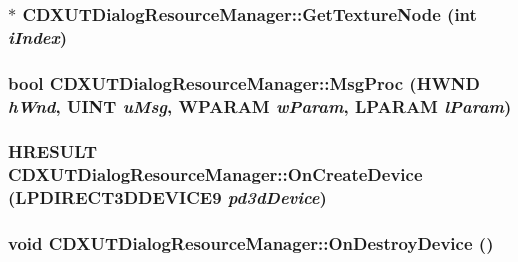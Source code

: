 \label{class_c_d_x_u_t_dialog_resource_manager_a06bc003b7adeab308924d576872d7808}
\hypertarget{class_c_d_x_u_t_dialog_resource_manager_a1c4a4da7f12745983dd5f3f945457b6f}{
\subsubsection[{GetTextureNode}]{$\ast$ CDXUTDialogResourceManager::GetTextureNode ({\bf int} {\em iIndex})}}
\label{class_c_d_x_u_t_dialog_resource_manager_a1c4a4da7f12745983dd5f3f945457b6f}
\hypertarget{class_c_d_x_u_t_dialog_resource_manager_a5eb2225e9b52752735c7557734bc009d}{
\subsubsection[{MsgProc}]{\setlength{\rightskip}{0pt plus 5cm}bool CDXUTDialogResourceManager::MsgProc (HWND {\em hWnd}, \/  UINT {\em uMsg}, \/  WPARAM {\em wParam}, \/  LPARAM {\em lParam})}}
\label{class_c_d_x_u_t_dialog_resource_manager_a5eb2225e9b52752735c7557734bc009d}
\hypertarget{class_c_d_x_u_t_dialog_resource_manager_a6b5ce20418b9af09844c9d4a7cede1f3}{
\subsubsection[{OnCreateDevice}]{\setlength{\rightskip}{0pt plus 5cm}HRESULT CDXUTDialogResourceManager::OnCreateDevice (LPDIRECT3DDEVICE9 {\em pd3dDevice})}}
\label{class_c_d_x_u_t_dialog_resource_manager_a6b5ce20418b9af09844c9d4a7cede1f3}
\hypertarget{class_c_d_x_u_t_dialog_resource_manager_aaf6a1da79ca795d3df60142f985d39f0}{
\subsubsection[{OnDestroyDevice}]{\setlength{\rightskip}{0pt plus 5cm}void CDXUTDialogResourceManager::OnDestroyDevice ()}}
